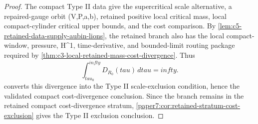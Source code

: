 \documentclass[11pt]{amsart}
\def\({}%
\def\){}%
\def\tilde#1{#1}%
\def\mathfrak#1{#1}%
\def\tau{tau}%
\def\infty{infty}%
\theoremstyle{plain}
\theoremstyle{definition}
\theoremstyle{remark}
\begin{document}
\begin{proof}
The compact Type II data give the supercritical scale alternative,
a repaired-gauge orbit \((V,P,a,b)\), retained positive local critical mass,
local compact-cylinder critical upper bounds, and the cost comparison.  By
\cref{lem:c5-retained-data-supply-aubin-lions}, the retained branch also has the
local compact-window, pressure, \(H^1\), time-derivative, and bounded-limit
routing package required by
\cref{thm:c3-local-retained-mass-cost-divergence}.
Thus
\[
  \int_{\tau_0}^{\infty}
  \tilde{\mathfrak D}_{R_0}(\tau)\,d\tau=\infty.
\]
 converts this divergence into the Type II
scale-exclusion condition, hence the validated compact cost-divergence
conclusion.  Since the branch remains in the retained compact cost-divergence
stratum, \cref{paper7:cor:retained-stratum-cost-exclusion} gives the Type II
exclusion conclusion.
\end{proof}

\clearpage


\end{document}
